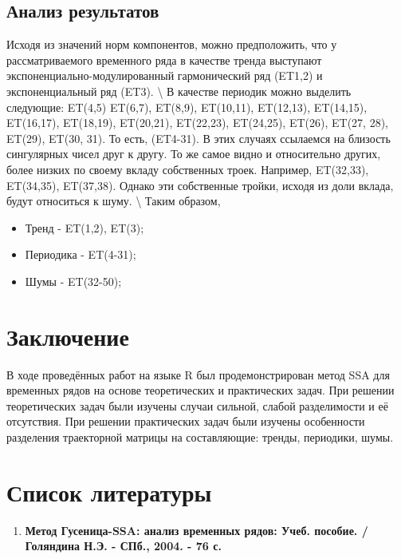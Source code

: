 \documentclass[
]{article}
\begin{document}
\subsection{Анализ результатов}

Исходя из значений норм компонентов, можно предположить, что у
рассматриваемого временного ряда в качестве тренда выступают
экспоненциально-модулированный гармонический ряд (ET1,2) и
экспоненциальный ряд (ET3). \textbackslash{} В качестве периодик можно
выделить следующие: ET(4,5) ET(6,7), ET(8,9), ET(10,11), ET(12,13),
ET(14,15), ET(16,17), ET(18,19), ET(20,21), ET(22,23), ET(24,25),
ET(26), ET(27, 28), ET(29), ET(30, 31). То есть, (ET4-31). В этих
случаях ссылаемся на близость сингулярных чисел друг к другу. То же
самое видно и относительно других, более низких по своему вкладу
собственных троек. Например, ET(32,33), ET(34,35), ET(37,38). Однако эти
собственные тройки, исходя из доли вклада, будут относиться к шуму.
\textbackslash{} Таким образом,

\begin{itemize}
    \item Тренд - ET(1,2), ET(3);
    \item Периодика - ET(4-31);
    \item Шумы - ET(32-50);
\end{itemize}
\newpage
\section{Заключение}

В ходе проведённых работ на языке R был продемонстрирован метод SSA для
временных рядов на основе теоретических и практических задач. При
решении теоретических задач были изучены случаи сильной, слабой
разделимости и её отсутствия. При решении практических задач были
изучены особенности разделения траекторной матрицы на составляющие:
тренды, периодики, шумы.

\newpage
\section{Список литературы}
\begin{enumerate}
    \item \textbf{Метод Гусеница-SSA: анализ временных рядов: Учеб. пособие. / Голяндина Н.Э. - СПб., 2004. - 76 с.}
\end{enumerate}
\end{document}
